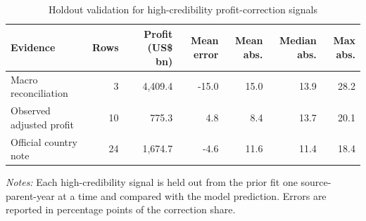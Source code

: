\begin{table}[H]
\centering
\footnotesize
\setlength{\tabcolsep}{3pt}
\caption{Holdout validation for high-credibility profit-correction signals}
\label{tab:profit_correction_validation_holdout}
\begin{tabular}{@{}lrrrrrr@{}}
\toprule
Evidence & Rows & Profit (US\$ bn) & Mean error & Mean abs. & Median abs. & Max abs. \\
\midrule
Macro reconciliation &  3 & 4,409.4 & -15.0 & 15.0 & 13.9 & 28.2 \\
Observed adjusted profit & 10 &   775.3 &   4.8 &  8.4 & 13.7 & 20.1 \\
Official country note & 24 & 1,674.7 &  -4.6 & 11.6 & 11.4 & 18.4 \\
\bottomrule
\end{tabular}

\vspace{0.35em}
\noindent\begin{minipage}{\textwidth}
\footnotesize\raggedright\textit{Notes:} Each high-credibility signal is held out from the prior fit one source-parent-year at a time and compared with the model prediction. Errors are reported in percentage points of the correction share.
\end{minipage}
\end{table}
